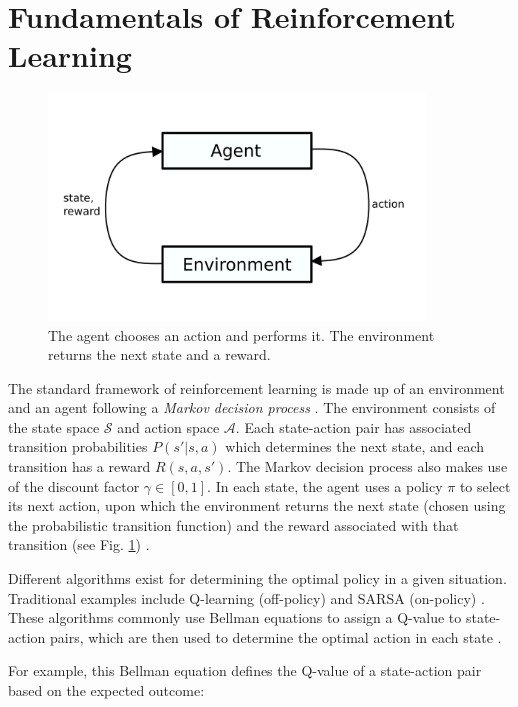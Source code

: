 \documentclass[runningheads]{llncs}
\begin{document}
\newpage
\section{Fundamentals of Reinforcement Learning}

\begin{figure}
    \centering
    \includegraphics[width=10cm]{submission/figures/figure-basics.pdf}
    \caption{The agent chooses an action and performs it. The environment returns the next state and a reward.} \label{fig-basics}
\end{figure}

The standard framework of reinforcement learning is made up of an environment and an agent following a \textit{Markov decision process} \cite{sutton2018reinforcement}. The environment consists of the state space $\mathcal{S}$ and action space $\mathcal{A}$. Each state-action pair has associated transition probabilities $P(s'|s,a)$ which determines the next state, and each transition has a reward $R(s,a,s')$. The Markov decision process also makes use of the discount factor $\gamma \in [0,1]$. In each state, the agent uses a policy $\pi$ to select its next action, upon which the environment returns the next state (chosen using the probabilistic transition function) and the reward associated with that transition (see Fig. \ref{fig-basics}) \cite{sutton2018reinforcement}.

Different algorithms exist for determining the optimal policy in a given situation. Traditional examples include Q-learning (off-policy) and SARSA (on-policy) \cite{sutton2018reinforcement,watkins1992q}. These algorithms commonly use Bellman equations to assign a Q-value to state-action pairs, which are then used to determine the optimal action in each state \cite{sutton2018reinforcement}.

For example, this Bellman equation defines the Q-value of a state-action pair based on the expected outcome:
\end{document}
